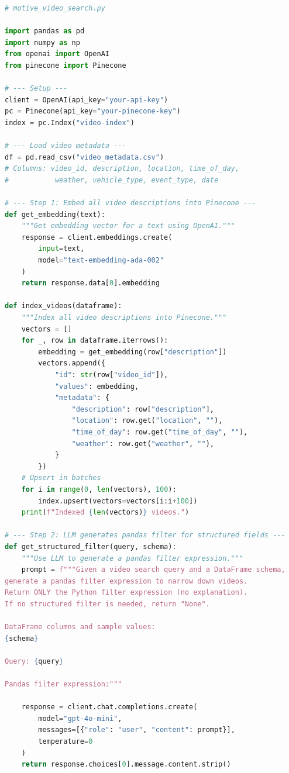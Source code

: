 \documentclass[11pt,a4paper]{article}
\begin{document}
\begin{lstlisting}[language=Python, caption={Motive Video Search --- Hybrid Approach}]
# motive_video_search.py

import pandas as pd
import numpy as np
from openai import OpenAI
from pinecone import Pinecone

# --- Setup ---
client = OpenAI(api_key="your-api-key")
pc = Pinecone(api_key="your-pinecone-key")
index = pc.Index("video-index")

# --- Load video metadata ---
df = pd.read_csv("video_metadata.csv")
# Columns: video_id, description, location, time_of_day,
#           weather, vehicle_type, event_type, date

# --- Step 1: Embed all video descriptions into Pinecone ---
def get_embedding(text):
    """Get embedding vector for a text using OpenAI."""
    response = client.embeddings.create(
        input=text,
        model="text-embedding-ada-002"
    )
    return response.data[0].embedding

def index_videos(dataframe):
    """Index all video descriptions into Pinecone."""
    vectors = []
    for _, row in dataframe.iterrows():
        embedding = get_embedding(row["description"])
        vectors.append({
            "id": str(row["video_id"]),
            "values": embedding,
            "metadata": {
                "description": row["description"],
                "location": row.get("location", ""),
                "time_of_day": row.get("time_of_day", ""),
                "weather": row.get("weather", ""),
            }
        })
    # Upsert in batches
    for i in range(0, len(vectors), 100):
        index.upsert(vectors=vectors[i:i+100])
    print(f"Indexed {len(vectors)} videos.")

# --- Step 2: LLM generates pandas filter for structured fields ---
def get_structured_filter(query, schema):
    """Use LLM to generate a pandas filter expression."""
    prompt = f"""Given a video search query and a DataFrame schema,
generate a pandas filter expression to narrow down videos.
Return ONLY the Python filter expression (no explanation).
If no structured filter is needed, return "None".

DataFrame columns and sample values:
{schema}

Query: {query}

Pandas filter expression:"""

    response = client.chat.completions.create(
        model="gpt-4o-mini",
        messages=[{"role": "user", "content": prompt}],
        temperature=0
    )
    return response.choices[0].message.content.strip()


\end{lstlisting}
\end{document}
